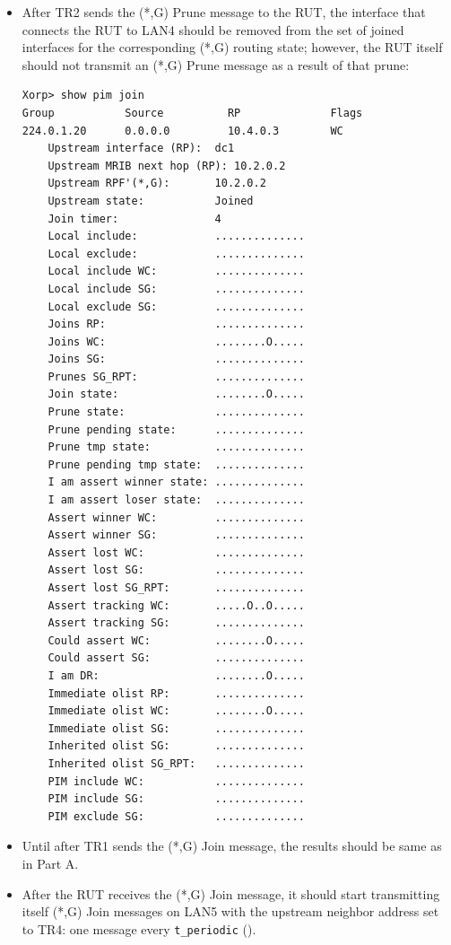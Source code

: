 \documentclass[11pt]{report}
\begin{document}
\begin{itemize}
  \item After TR2 sends the (*,G) Prune message to the RUT, the interface
  that connects the RUT to LAN4 should be removed from the set of joined
  interfaces for the corresponding (*,G) routing state; however, the RUT
  itself should not transmit an (*,G) Prune message as a result of that
  prune:

\begin{verbatim}
Xorp> show pim join
Group           Source          RP              Flags
224.0.1.20      0.0.0.0         10.4.0.3        WC   
    Upstream interface (RP):  dc1
    Upstream MRIB next hop (RP): 10.2.0.2
    Upstream RPF'(*,G):       10.2.0.2
    Upstream state:           Joined 
    Join timer:               4
    Local include:            ..............
    Local exclude:            ..............
    Local include WC:         ..............
    Local include SG:         ..............
    Local exclude SG:         ..............
    Joins RP:                 ..............
    Joins WC:                 ........O.....
    Joins SG:                 ..............
    Prunes SG_RPT:            ..............
    Join state:               ........O.....
    Prune state:              ..............
    Prune pending state:      ..............
    Prune tmp state:          ..............
    Prune pending tmp state:  ..............
    I am assert winner state: ..............
    I am assert loser state:  ..............
    Assert winner WC:         ..............
    Assert winner SG:         ..............
    Assert lost WC:           ..............
    Assert lost SG:           ..............
    Assert lost SG_RPT:       ..............
    Assert tracking WC:       .....O..O.....
    Assert tracking SG:       ..............
    Could assert WC:          ........O.....
    Could assert SG:          ..............
    I am DR:                  ........O.....
    Immediate olist RP:       ..............
    Immediate olist WC:       ........O.....
    Immediate olist SG:       ..............
    Inherited olist SG:       ..............
    Inherited olist SG_RPT:   ..............
    PIM include WC:           ..............
    PIM include SG:           ..............
    PIM exclude SG:           ..............
\end{verbatim}

\end{itemize}


\begin{itemize}

  \item Until after TR1 sends the (*,G) Join message, the results should be
  same as in Part A.

  \item After the RUT receives the (*,G) Join message, it should start
  transmitting itself (*,G) Join messages on LAN5 with the upstream
  neighbor address set to TR4: one message every \verb=t_periodic=
  ({\PimsmTPeriodic}).

\end{itemize}
\end{document}
